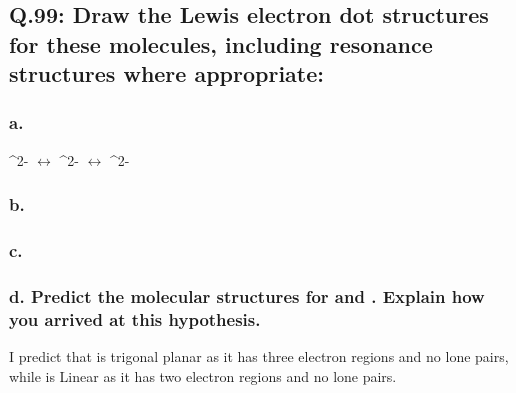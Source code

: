 \documentclass[11pt, letterpaper]{article}
\begin{document}
\subsection*{Q.99: Draw the Lewis electron dot structures for these molecules, including
resonance structures where appropriate:}

\subsubsection*{a. }

\begin{center}
	\chemleft[
	\chemfig{\lewis{S}{}{}{.}{.}{}{}{.}{.}=C(-[6]\lewis{S}{.}{.}{}{}{.}{.}{.}{.})-\lewis{S}{}{}{.}{.}{.}{.}{.}{.}}
	\chemright]^{2-}
	$\longleftrightarrow$
	\chemleft[
	\chemfig{\lewis{S}{.}{.}{.}{.}{}{}{.}{.}-C(=[6]\lewis{S}{.}{.}{}{}{.}{.}{}{})-\lewis{S}{}{}{.}{.}{.}{.}{.}{.}}
	\chemright]^{2-}
	$\longleftrightarrow$
	\chemleft[
	\chemfig{\lewis{S}{.}{.}{.}{.}{}{}{.}{.}-C(-[6]\lewis{S}{.}{.}{}{}{.}{.}{.}{.})=\lewis{S}{}{}{.}{.}{}{}{.}{.}}
	\chemright]^{2-}
\end{center}

\subsubsection*{b. }


\begin{center}
	\chemleft[
	\chemfig{\lewis{S}{}{}{.}{.}{}{}{.}{.}=C=\lewis{S}{}{}{.}{.}{}{}{.}{.}}
	\chemright]
\end{center}

\subsubsection*{c. }

\begin{center}
\end{center}

\subsubsection*{d. Predict the molecular structures for  and . 
Explain how you arrived at this hypothesis.}

I predict that  is trigonal planar as it has three electron regions and no
lone pairs, while  is Linear as it has two electron regions and no lone pairs.
\end{document}
